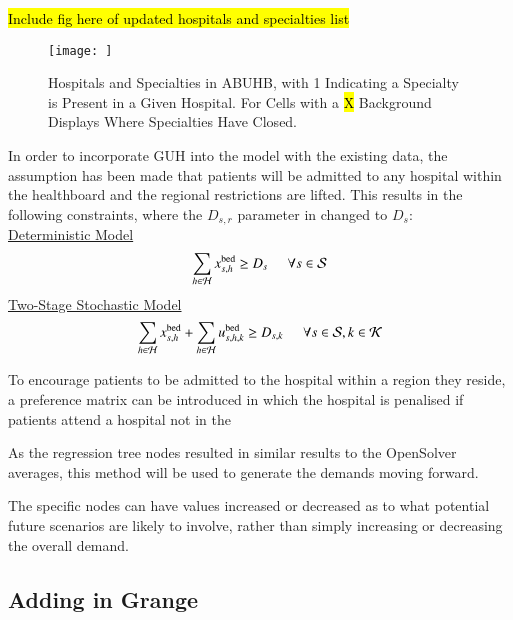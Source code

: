 \documentclass[../thesis.tex]{subfiles}
\begin{document}
\hl{Include fig here of updated hospitals and specialties list}
\begin{figure}
    \centering
    \texttt{[image: ]}
    \caption{Hospitals and Specialties in ABUHB, with 1 Indicating a Specialty is Present in a Given Hospital. For Cells with a \hl{X} Background Displays Where Specialties Have Closed.}
    \label{fig:relocation}
\end{figure}

In order to incorporate GUH into the model with the existing data, the assumption has been made that patients will be admitted to any hospital within the healthboard and the regional restrictions are lifted. This results in the following constraints, where the $D_{s,r}$ parameter in changed to $D_{s}$:\\
\underline{Deterministic Model}
\begin{equation}
    \sum_{h\in\mathcal{H}} x^\textnormal{bed}_{s,h}\geq D_{s}  \hspace{0.5cm} \forall  s \in \mathcal{S}
\end{equation}
\underline{Two-Stage Stochastic Model}
\begin{equation}
    \sum_{h\in\mathcal{H}} x^\textnormal{bed}_{s,h} +  \sum_{h\in\mathcal{H}} u^\textnormal{bed}_{s,h,k} \geq D_{s,k} \hspace{0.5cm} \forall s \in \mathcal{S}, k \in \mathcal{K}\\
\end{equation}

To encourage patients to be admitted to the hospital within a region they reside, a preference matrix can be introduced in which the hospital is penalised if patients attend a hospital not in the

As the regression tree nodes resulted in similar results to the OpenSolver averages, this method will be used to generate the demands moving forward. 

The specific nodes can have values increased or decreased as to what potential future scenarios are likely to involve, rather than simply increasing or decreasing the overall demand. 




\subsection{Adding in Grange}
\end{document}
